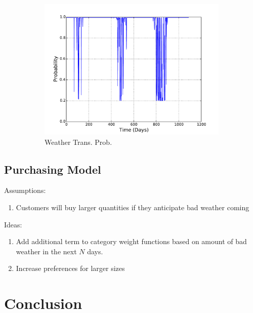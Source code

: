 \documentclass[11pt, letterpaper]{article}
\begin{document}
\begin{figure}[H]
\begin{subfigure}[b]{0.45\textwidth}
    \includegraphics[width=\textwidth]{figures/weather_trans_prob.pdf}
    \caption{Weather Trans. Prob.}
  \end{subfigure}
  \label{fig:analysis}
  \caption{}
\end{figure}


\subsection{Purchasing Model}



Assumptions:
\begin{enumerate}
\item Customers will buy larger quantities if they anticipate bad weather coming
\end{enumerate}

Ideas:
\begin{enumerate}
\item Add additional term to category weight functions based on amount of bad weather in the next $N$ days.
\item Increase preferences for larger sizes
\end{enumerate}


\section{Conclusion}


%
%
\end{document}

